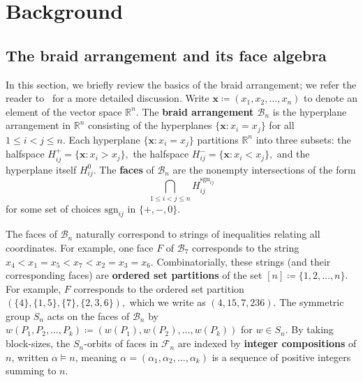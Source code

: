 \documentclass[ALCO, Unicode]{cedram}
\def\sgn{\mathrm{sgn}}
\begin{document}
\section{Background}\label{sec:two-algebras}
\subsection{The braid arrangement and its face algebra}
In this section, we briefly review the basics of the braid arrangement; we refer the reader to~\cite[Ch. 6]{Aguiar-Mahajan} for a more detailed discussion. Write $\mathbf{x} \coloneqq  (x_1, x_2, \ldots, x_n)$ to denote an element of the vector space $\mathbb{R}^n.$ The \textbf{braid arrangement $\mathcal{B}_n$} is the hyperplane arrangement in $\mathbb{R}^n$ consisting of the hyperplanes $\{\mathbf{x}: x_i = x_j\}$ for all $1 \leq i < j \leq n.$ Each hyperplane $\{\mathbf{x}: x_i = x_j\}$ partitions $\mathbb{R}^n$ into three subsets: the halfspace $H_{ij}^+ = \{\mathbf{x}: x_i > x_j\},$ the halfspace $H_{ij}^- = \{\mathbf{x}: x_i < x_j\},$ and the hyperplane itself $H_{ij}^0.$ The \textbf{faces} of $\mathcal{B}_n$ are the nonempty intersections of the form \[\bigcap_{1 \leq i < j \leq n}H_{ij}^{\sgn_{ij}}\] for some set of choices $\sgn_{ij}$ in $\{+, -, 0\}.$ 

The faces of $\mathcal{B}_n$ naturally correspond to strings of inequalities relating all coordinates. For example, one face $F $ of $\mathcal{B}_7$  corresponds to the string $x_4 < x_1 = x_5 < x_7 < x_2 = x_3 = x_6$. Combinatorially, these strings (and their corresponding faces) are {\textbf{ordered set partitions}} of the set $[n] \coloneqq  \{1, 2, \ldots, n\}$. For example, $F$ corresponds to the ordered set partition $\left (\{4\}, \{1, 5\}, \{7\}, \{2, 3, 6\}\right),$ which we write as $(4, 15, 7, 236).$ The symmetric group \textbf{$S_n$} acts on the faces of $\mathcal{B}_n$ by $w \left(P_1, P_2, \ldots, P_k\right)  \coloneqq  \left(w(P_1), w(P_2), \ldots, w(P_k)\right)$ for $w \in S_n.$ By taking block-sizes, the $S_n$-orbits of faces in $\mathcal{F}_n$ are indexed by \textbf{integer compositions} of $n$, written $\alpha \vDash n$, meaning $\alpha = (\alpha_1, \alpha_2, \ldots, \alpha_k)$ is a sequence of positive integers summing to $n.$
\end{document}

